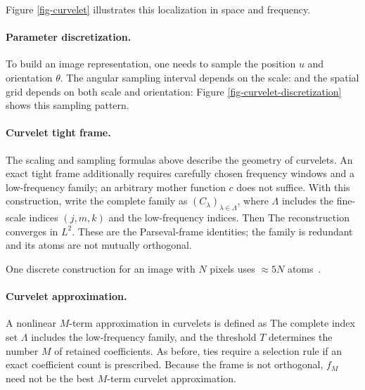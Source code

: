 Figure \ref{fig-curvelet} illustrates this localization in space and frequency.

  
\paragraph{Parameter discretization.}

To build an image representation, one needs to sample the position $u$ and orientation $\theta$.
The angular sampling interval depends on the scale:
and the spatial grid depends on both scale and orientation:
Figure \ref{fig-curvelet-discretization} shows this sampling pattern.


  
\paragraph{Curvelet tight frame.}

The scaling and sampling formulas above describe the geometry of curvelets. An exact tight frame additionally requires carefully chosen frequency windows and a low-frequency family; an arbitrary mother function $c$ does not suffice. With this construction, write the complete family as $(C_\lambda)_{\lambda\in\Lambda}$, where $\Lambda$ includes the fine-scale indices $(j,m,k)$ and the low-frequency indices. Then
The reconstruction converges in $L^2$. These are the Parseval-frame identities; the family is redundant and its atoms are not mutually orthogonal.

One discrete construction for an image with $N$ pixels uses $\approx 5 N$ atoms~\cite{candes-discrete-curvelet}.

  
\paragraph{Curvelet approximation.}

A nonlinear $M$-term approximation in curvelets is defined as
The complete index set $\Lambda$ includes the low-frequency family, and the threshold $T$ determines the number $M$ of retained coefficients. As before, ties require a selection rule if an exact coefficient count is prescribed. Because the frame is not orthogonal, $f_M$ need not be the best $M$-term curvelet approximation.

